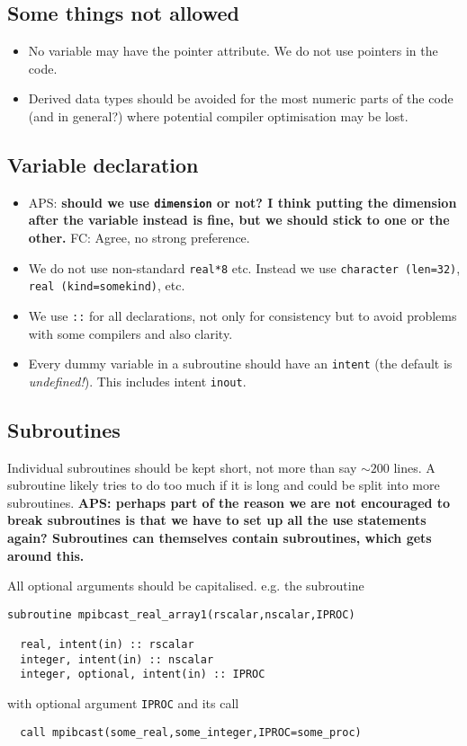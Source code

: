 \documentclass[12pt,twoside,notitlepage,a4paper]{article}
\newcommand{\code}[1]{\texttt{#1}}
\begin{document}
\subsection{Some things not allowed}

\begin{itemize}
\item No variable may have the pointer attribute. We do not use pointers in the code.
\item Derived data types should be avoided for the most numeric parts of the code (and in general?)
where potential compiler optimisation may be lost.
\end{itemize}

\subsection{Variable declaration}

\begin{itemize}
\item {APS: \bf should we use \code{dimension} or not? I think putting the dimension after the
variable instead is fine, but we should stick to one or the other.} FC: Agree, no strong preference.
\item We do not use non-standard \code{real*8} etc. Instead we use \code{character (len=32)}, 
\code{real (kind=somekind)}, etc.
\item We use \code{::} for all declarations, not only for consistency but to avoid problems with some
compilers and also clarity.
\item Every dummy variable in a subroutine should have an \code{intent} (the default is
{\it undefined!}). This includes intent \code{inout}.
\end{itemize}

\subsection{Subroutines}

Individual subroutines should be kept short, not more than say $\sim200$ lines. A subroutine likely
tries to do too much if it is long and could be split into more subroutines.
{\bf APS: perhaps part of the reason we are not encouraged to break subroutines is that we have
to set up all the use statements again? Subroutines can themselves contain subroutines, which
gets around this.}

All optional arguments should be capitalised.
e.g. the subroutine
\begin{verbatim}
subroutine mpibcast_real_array1(rscalar,nscalar,IPROC)

  real, intent(in) :: rscalar
  integer, intent(in) :: nscalar
  integer, optional, intent(in) :: IPROC
\end{verbatim}
with optional argument \code{IPROC} and its call
\begin{verbatim}
  call mpibcast(some_real,some_integer,IPROC=some_proc)
\end{verbatim}
\end{document}
